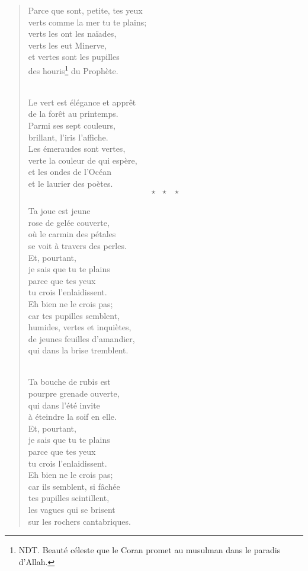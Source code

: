 \documentclass[a4paper,11pt]{book}
\begin{document}
\begin{verse}
Parce que sont, petite, tes yeux \\
verts comme la mer tu te plains; \\
verts les ont les naïades, \\
verts les eut Minerve, \\
et vertes sont les pupilles \\
des houris\footnote{NDT. Beauté céleste que le Coran promet au musulman dans le paradis d'Allah.} du Prophète. \\ \

Le vert est élégance et apprêt \\
de la forêt au printemps. \\
Parmi ses sept couleurs, \\
brillant, l'iris l'affiche. \\
Les émeraudes sont vertes, \\
verte la couleur de qui espère, \\
et les ondes de l'Océan \\
et le laurier des poètes. \\

$$\star \ \ \ \star \ \ \ \star$$ \\

Ta joue est jeune \\
rose de gelée couverte, \\
où le carmin des pétales \\
se voit à travers des perles. \\
Et, pourtant, \\
je sais que tu te plains \\
parce que tes yeux \\
tu crois l'enlaidissent. \\
Eh bien ne le crois pas; \\
car tes pupilles semblent, \\
humides, vertes et inquiètes, \\
de jeunes feuilles d'amandier, \\
qui dans la brise tremblent. \\ \

Ta bouche de rubis est \\
pourpre grenade ouverte, \\
qui dans l'été invite \\
à éteindre la soif en elle. \\
Et, pourtant, \\
je sais que tu te plains \\
parce que tes yeux \\
tu crois l'enlaidissent. \\
Eh bien ne le crois pas; \\
car ils semblent, si fâchée \\
tes pupilles scintillent, \\
les vagues qui se brisent \\
sur les rochers cantabriques. \\


\end{verse}
\end{document}

